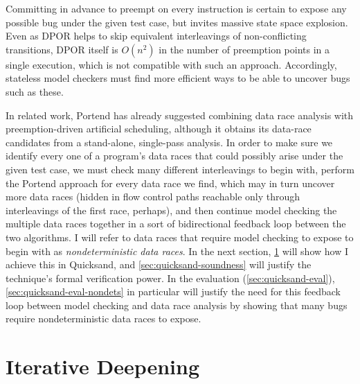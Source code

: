 
Committing in advance to
preempt on every instruction is certain to expose any possible bug under the given test case,
but invites massive state space explosion.
Even as DPOR helps to skip equivalent interleavings of non-conflicting transitions,
DPOR itself is $O(n^2)$ in the number of preemption points in a single execution,
which is not compatible with such an approach.
Accordingly, stateless model checkers must find more efficient ways to be able to uncover bugs such as these.

In related work,
Portend \cite{portend} has already suggested combining data race analysis with preemption-driven artificial scheduling,
although it obtains its data-race candidates from a stand-alone, single-pass analysis.
In order to make sure we identify every one of a program's data races that could possibly arise under the given test case,
we must check many different interleavings to begin with,
perform the Portend approach for every data race we find,
which may in turn uncover more data races
(hidden in flow control paths reachable only through interleavings of the first race, perhaps),
and then continue model checking the multiple data races together
in a sort of bidirectional feedback loop between the two algorithms.
I will refer to data races that require model checking to expose to begin with as
{\em nondeterministic data races}. %
In the next section,
\cref{sec:quicksand-id} will show how I achieve this in Quicksand, and
\cref{sec:quicksand-soundness} will justify the technique's formal verification power.
In the evaluation (\cref{sec:quicksand-eval}),
\cref{sec:quicksand-eval-nondets} in particular will justify the need
for this feedback loop between model checking and data race analysis
by showing that many bugs require nondeterministic data races to expose.


\section{Iterative Deepening}
\label{sec:quicksand-id}

